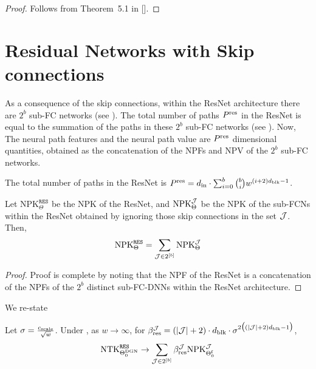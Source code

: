 \begin{proof}
Follows from Theorem~5.1 in [].
\end{proof}

\section{Residual Networks with Skip connections}

As a consequence of the skip connections, within the ResNet architecture there are $2^b$ sub-FC networks (see ). The total number of paths $P^{\text{res}}$ in the ResNet is equal to the summation of the paths in these $2^b$ sub-FC networks (see ). Now, The neural path features and the neural path value are $P^{\text{res}}$ dimensional quantities, obtained as the concatenation of the NPFs and NPV of the $2^b$ sub-FC networks. 

\begin{proposition}\label{prop:resnetpath}
The total number of paths in the ResNet is  $P^{\text{res}} = d_{\text{in}} \cdot\sum_{i=0}^b \binom{b}{i} w^{(i+2)d_{\text{blk}}-1}$.
\end{proposition}

\begin{lemma}\label{lm:sumofproduct}
Let $\text{NPK}^{\texttt{RES}}_{\Theta}$ be the NPK of the ResNet, and $\text{NPK}^{\mathcal{J}}_{\Theta}$ be the NPK of the sub-FCNs within the ResNet obtained by ignoring those skip connections in the set $\mathcal{J}$. Then, \begin{align*}\text{NPK}^{\texttt{RES}}_{\Theta}=\sum_{\mathcal{J}\in 2^{[b]}}\text{NPK}^{\mathcal{J}}_{\Theta}\end{align*}
\end{lemma}
\begin{proof}
Proof is complete by noting that the NPF of the ResNet is a concatenation of the NPFs of the $2^b$ distinct sub-FC-DNNs within the ResNet architecture.
\end{proof}

We re-state 
\begin{theorem} Let $\sigma=\frac{c_{\text{scale}}}{\sqrt{w}}$. Under , as $w\rightarrow\infty$,  for $\beta_{\text{res}}^{\mathcal{J}} = (|\mathcal{J}| +2)\cdot d_{\text{blk}}\cdot \sigma^{2\big( (|\mathcal{J}|+2)d_{\text{blk}}-1\big)}$,
\begin{align*}
\text{NTK}^{\texttt{RES}}_{\Theta^{\text{DGN}}_0}\rightarrow \sum_{\mathcal{J}\in 2^{[b]}}  \beta_{\text{res}}^{\mathcal{J}} \text{NPK}^{\mathcal{J}}_{\Theta^{\textrm{f}}_0}
\end{align*}
\end{theorem}


